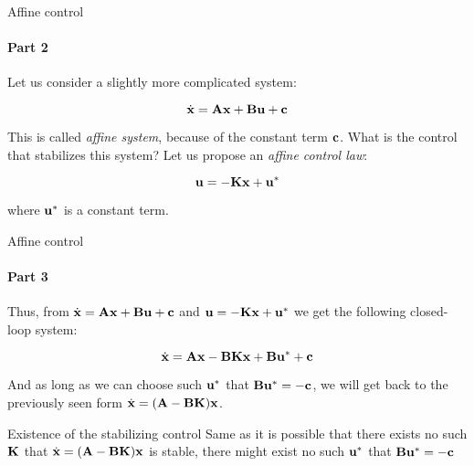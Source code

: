 \documentclass{beamer}
\begin{document}
\begin{frame}{Affine control}
\framesubtitle{Part 2}
\begin{flushleft}

Let us consider a slightly more complicated system:

\begin{equation}
    \dot{\mathbf{x}} = \mathbf{A}\mathbf{x} + \mathbf{B}\mathbf{u} + \mathbf{c}
\end{equation}

This is called \emph{affine system}, because of the constant term $\mathbf{c}$. What is the control that stabilizes this system? Let us propose an \emph{affine control law}:

\begin{equation}
    \mathbf{u} = -\mathbf{K}\mathbf{x} + \mathbf{u}^*
\end{equation}

where $\mathbf{u}^*$ is a constant term.

\end{flushleft}
\end{frame}





\begin{frame}{Affine control}
\framesubtitle{Part 3}
\begin{flushleft}

Thus, from $\dot{\mathbf{x}} = \mathbf{A}\mathbf{x} + \mathbf{B}\mathbf{u} + \mathbf{c}$ and $\mathbf{u} = -\mathbf{K}\mathbf{x} + \mathbf{u}^*$ we get the following closed-loop system:

\begin{equation}
    \dot{\mathbf{x}} = \mathbf{A}\mathbf{x} - \mathbf{B}\mathbf{K}\mathbf{x} + \mathbf{B}\mathbf{u}^* + \mathbf{c}
\end{equation}

And as long as we can choose such $\mathbf{u}^*$ that $\mathbf{B}\mathbf{u}^* = -\mathbf{c}$, we will get back to the previously seen form $\dot{\mathbf{x}} = (\mathbf{A} - \mathbf{B}\mathbf{K})\mathbf{x}$.

\bigskip

\begin{block}{Existence of the stabilizing control}
Same as it is possible that there exists no such $\mathbf{K}$ that $\dot{\mathbf{x}} = (\mathbf{A} - \mathbf{B}\mathbf{K})\mathbf{x}$ is stable, there might exist no such $\mathbf{u}^*$ that $\mathbf{B}\mathbf{u}^* = -\mathbf{c}$
\end{block}

\end{flushleft}
\end{frame}
\end{document}

